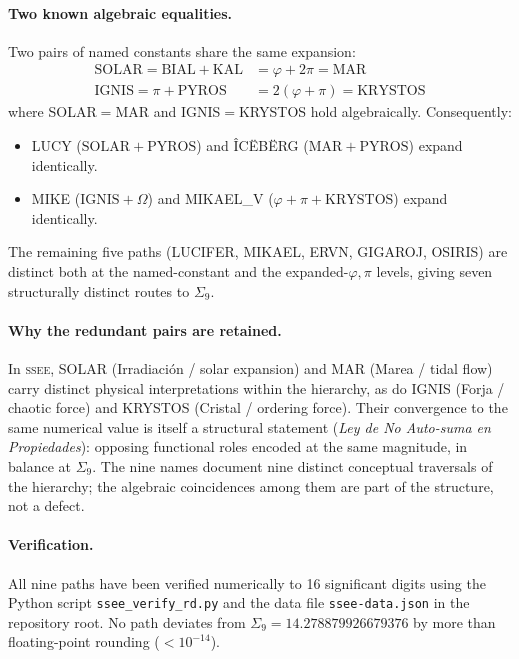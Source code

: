 \documentclass[12pt,a4paper]{article}
\newcommand{\SSEE}{\ifmmode\mathrm{SSEE}\else\textsc{ssee}\fi}
\begin{document}
\paragraph{Two known algebraic equalities.}
Two pairs of named constants share the same expansion:
\begin{align}
\mathrm{SOLAR} = \mathrm{BIAL}+\mathrm{KAL} &= \varphi+2\pi = \mathrm{MAR} \\
\mathrm{IGNIS} = \pi+\mathrm{PYROS} &= 2(\varphi+\pi) = \mathrm{KRYSTOS}
\end{align}
where SOLAR$=$MAR and IGNIS$=$KRYSTOS hold algebraically.
Consequently:
\begin{itemize}
  \item LUCY ($\mathrm{SOLAR}+\mathrm{PYROS}$) and \^{I}C\"{E}B\"{E}RG
        ($\mathrm{MAR}+\mathrm{PYROS}$) expand identically.
  \item MIKE ($\mathrm{IGNIS}+\Omega$) and MIKAEL\_V ($\varphi+\pi+\mathrm{KRYSTOS}$)
        expand identically.
\end{itemize}
The remaining five paths (LUCIFER, MIKAEL, ERVN, GIGAROJ, OSIRIS) are
distinct both at the named-constant and the expanded-$\varphi,\pi$ levels,
giving seven structurally distinct routes to $\Sigma_9$.

\paragraph{Why the redundant pairs are retained.}
In \SSEE, SOLAR (Irradiación / solar expansion) and MAR (Marea / tidal flow)
carry distinct physical interpretations within the hierarchy, as do IGNIS
(Forja / chaotic force) and KRYSTOS (Cristal / ordering force).
Their convergence to the same numerical value is itself a structural statement
(\emph{Ley de No Auto-suma en Propiedades}): opposing functional roles encoded
at the same magnitude, in balance at $\Sigma_9$.
The nine names document nine distinct conceptual traversals of the hierarchy;
the algebraic coincidences among them are part of the structure, not a defect.

\paragraph{Verification.}
All nine paths have been verified numerically to 16 significant digits using
the Python script \texttt{ssee\_verify\_rd.py} and the data file
\texttt{ssee-data.json} in the repository root.
No path deviates from $\Sigma_9 = 14.278879926679376$ by more than floating-point
rounding ($<10^{-14}$).
\end{document}
